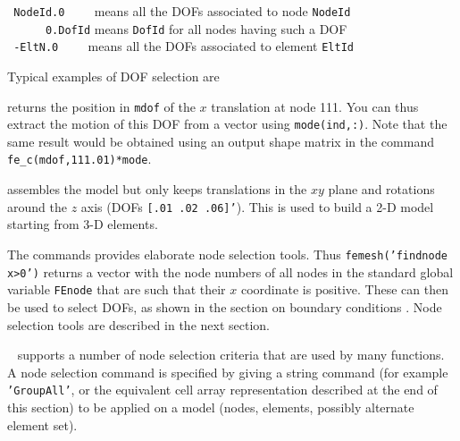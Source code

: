 \lvs\noindent
{\tt \verb| NodeId.0    |}  means all the DOFs associated to node {\tt NodeId} \\
{\tt \verb|      0.DofId|} means {\tt DofId} for all nodes having such a DOF\\
{\tt \verb| -EltN.0    |} means all the DOFs associated to element {\tt  EltId}

\lvs Typical examples of DOF selection are 

 returns the position in {\tt mdof} of the $x$ translation at node 111. You can thus extract the motion of this DOF from a vector using {\tt mode(ind,:)}. Note that the same result would be obtained using an output shape matrix in the command {\tt fe\_c(mdof,111.01)*mode}.


assembles the model but only keeps translations in the $xy$ plane and rotations around the $z$ axis (DOFs {\tt [.01 .02 .06]'}). This is used to build a 2-D model starting from 3-D elements.

\lvs The  commands provides elaborate node selection tools. Thus {\tt femesh('findnode x>0')} returns a vector with the node numbers of all nodes in the standard global variable {\tt FEnode} that are such that their $x$ coordinate is positive. These can then be used to select DOFs, as shown in the section on boundary conditions . Node selection tools are described in the next section.

\newpage


\feutil\  supports a number of node selection criteria that are used by many functions. A node selection command is specified by giving a string command (for example {\tt 'GroupAll'}, or the equivalent cell array representation described at the end of this section) to be applied on a model (nodes, elements, possibly alternate element set).

